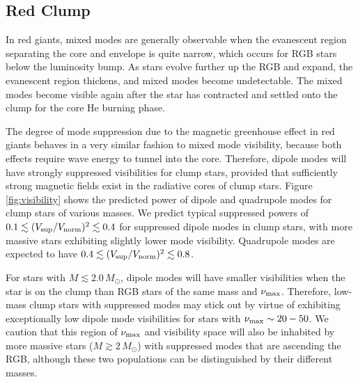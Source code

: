 \subsection{Red Clump}
\label{clump}
  

In red giants, mixed modes are generally observable when the evanescent region separating the core and envelope is quite narrow, which occurs for RGB stars below the luminosity bump. As stars evolve further up the RGB and expand, the evanescent region thickens, and mixed modes become undetectable. The mixed modes become visible again after the star has contracted and settled onto the clump for the core He burning phase. 

The degree of mode suppression due to the magnetic greenhouse effect in red giants behaves in a very similar fashion to mixed mode visibility, because both effects require wave energy to tunnel into the core. Therefore, dipole modes will have strongly suppressed visibilities for clump stars, provided that sufficiently strong magnetic fields exist in the radiative cores of clump stars. Figure \ref{fig:visibility} shows the predicted power of dipole and quadrupole modes for clump stars of various masses. We predict typical suppressed powers of $0.1 \lesssim (V_{\rm sup}/V_{\rm norm})^2 \lesssim 0.4$ for suppressed dipole modes in clump stars, with more massive stars exhibiting slightly lower mode visibility. Quadrupole modes are expected to have $0.4 \lesssim (V_{\rm sup}/V_{\rm norm})^2 \lesssim 0.8$. 

For stars with $M \lesssim 2.0 \, M_\odot$, dipole modes will have smaller visibilities when the star is on the clump than RGB stars of the same mass and $\nu_{\rm max}$. Therefore, low-mass clump stars with suppressed modes may stick out by virtue of exhibiting exceptionally low dipole mode visibilities for stars with $\nu_{\rm max} \sim 20-50$. We caution that this region of $\nu_{\rm max}$ and visibility space will also be inhabited by more massive stars ($M \gtrsim 2 \, M_\odot$) with suppressed modes that are ascending the RGB, although these two populations can be distinguished by their different masses. 
  